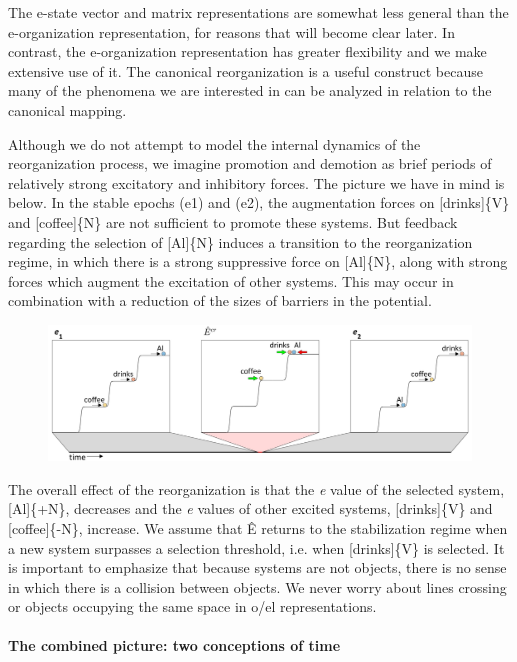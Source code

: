   The e-state vector and matrix representations are somewhat less general than the e-organization representation, for reasons that will become clear later. In contrast, the e-organization representation has greater flexibility and we make extensive use of it. The canonical reorganization is a useful construct because many of the phenomena we are interested in can be analyzed in relation to the canonical mapping.

  Although we do not attempt to model the internal dynamics of the reorganization process, we imagine promotion and demotion as brief periods of relatively strong excitatory and inhibitory forces. The picture we have in mind is below. In the stable epochs (e1) and (e2), the augmentation forces on [drinks]\{V\} and [coffee]\{N\} are not sufficient to promote these systems. But feedback regarding the selection of [Al]\{N\} induces a transition to the reorganization regime, in which there is a strong suppressive force on [Al]\{N\}, along with strong forces which augment the excitation of other systems. This may occur in combination with a reduction of the sizes of barriers in the potential. 

  
\begin{figure}
\includegraphics[width=\textwidth]{figures/Tilsen-img26.png}
\caption{\missingcaption}
\label{fig:}
\end{figure}
 

  The overall effect of the reorganization is that the \textit{e} value of the selected system, [Al]\{+N\}, decreases and the \textit{e} values of other excited systems, [drinks]\{V\} and [coffee]\{-N\}, increase. We assume that Ê returns to the stabilization regime when a new system surpasses a selection threshold, i.e. when [drinks]\{V\} is selected. It is important to emphasize that because systems are not objects, there is no sense in which there is a collision between objects. We never worry about lines crossing or objects occupying the same space in o/el representations.

\paragraph{The combined picture: two conceptions of time}

